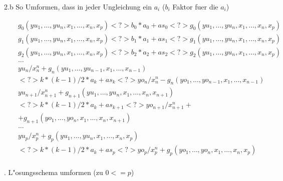 \bigskip\noindent
2.b So Umformen, dass in jeder Ungleichung ein $a_i$
($b_i$ Faktor fuer die $a_i$)

\begin{eqnarray*}
&& g_0( yu_1, \ldots, yu_{n}, x_1, \ldots, x_n, x_p) <?>  b_0 * a_0 + as_{0} <?> g_0( yu_1, \ldots, yu_{n}, x_1, \ldots, x_n, x_p)\\
&& g_1( yu_1, \ldots, yu_{n}, x_1, \ldots, x_n, x_p) <?>  b_1 * a_1 + as_{1} <?> g_1( yu_1, \ldots, yu_{n}, x_1, \ldots, x_n, x_p)\\
&& g_2( yu_1, \ldots, yu_{n}, x_1, \ldots, x_n, x_p) <?>  b_2 * a_2 + as_{2} <?> g_2( yu_1, \ldots, yu_{n}, x_1, \ldots, x_n, x_p)\\
&& \ldots\\
&& yu_n / x_n^n + g_n( yu_1, \ldots, yu_{n-1}, x_1, \ldots, x_{n-1}) \\
&&   <?>  k*(k-1)/2 * a_k + as_{k} <?> yo_n / x_n^n - g_n( yo_1, \ldots, yo_{n-1}, x_1, \ldots, x_{n-1})\\
&& yu_{n+1} / x_{n+1}^n + g_{n+1}( yu_1, \ldots, yu_{n}, x_1, \ldots, x_n, x_{n+1})\\
&&   <?> k*(k-1)/2 * a_{k} + as_{k+1} <?> yo_{n+1} / x_{n+1}^n +\\
&&   + g_{n+1}( yo_1, \ldots, yo_{n}, x_1, \ldots, x_n, x_{n+1})\\
&& \ldots\\
&& yu_p / x_p^n + g_p( yu_1, \ldots, yu_{n}, x_1, \ldots, x_n, x_p)\\
&&   <?> k*(k-1)/2 *  a_k  + as_{p} <?> yo_p / x_p^n + g_p( yo_1, \ldots, yo_{n}, x_1, \ldots, x_n, x_p)\\
\end{eqnarray*}


\bigskip{}. L"osungsschema umformen (zu $0 <= p$)


